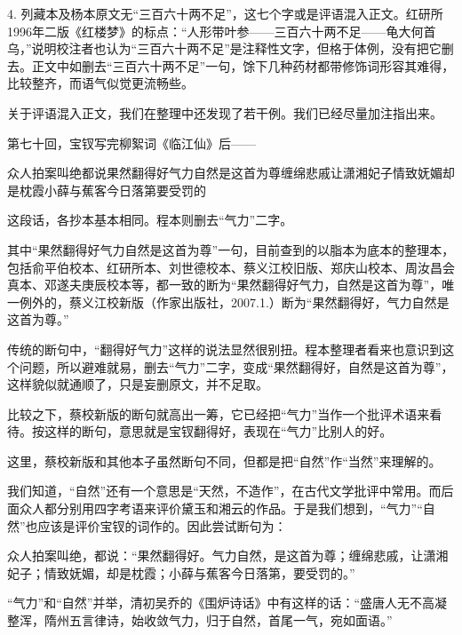 4.
列藏本及杨本原文无``三百六十两不足''，这七个字或是评语混入正文。红研所1996年二版《红楼梦》的标点：``人形带叶参------三百六十两不足------龟大何首乌，''说明校注者也认为``三百六十两不足''是注释性文字，但格于体例，没有把它删去。正文中如删去``三百六十两不足''一句，馀下几种药材都带修饰词形容其难得，比较整齐，而语气似觉更流畅些。

关于评语混入正文，我们在整理中还发现了若干例。我们已经尽量加注指出来。

{{}}

第七十回，宝钗写完柳絮词《临江仙》后------

众人拍案叫绝都说果然翻得好气力自然是这首为尊缠绵悲戚让潇湘妃子情致妩媚却是枕霞小薛与蕉客今日落第要受罚的

这段话，各抄本基本相同。程本则删去``气力''二字。

其中``果然翻得好气力自然是这首为尊''一句，目前查到的以脂本为底本的整理本，包括俞平伯校本、红研所本、刘世德校本、蔡义江校旧版、郑庆山校本、周汝昌会真本、邓遂夫庚辰校本等，都一致的断为``果然翻得好气力，自然是这首为尊''，唯一例外的，蔡义江校新版（作家出版社，2007.1.）断为``果然翻得好，气力自然是这首为尊。''

传统的断句中，``翻得好气力''这样的说法显然很别扭。程本整理者看来也意识到这个问题，所以避难就易，删去``气力''二字，变成``果然翻得好，自然是这首为尊''，这样貌似就通顺了，只是妄删原文，并不足取。

比较之下，蔡校新版的断句就高出一筹，它已经把``气力''当作一个批评术语来看待。按这样的断句，意思就是宝钗翻得好，表现在``气力''比别人的好。

这里，蔡校新版和其他本子虽然断句不同，但都是把``自然''作``当然''来理解的。

我们知道，``自然''还有一个意思是``天然，不造作''，在古代文学批评中常用。而后面众人都分别用四字考语来评价黛玉和湘云的作品。于是我们想到，``气力''``自然''也应该是评价宝钗的词作的。因此尝试断句为：

众人拍案叫绝，都说：``果然翻得好。气力自然，是这首为尊；缠绵悲戚，让潇湘妃子；情致妩媚，却是枕霞；小薛与蕉客今日落第，要受罚的。''

``气力''和``自然''并举，清初吴乔的《围炉诗话》中有这样的话：``盛唐人无不高凝整浑，隋州五言律诗，始收敛气力，归于自然，首尾一气，宛如面语。''

{{}}

